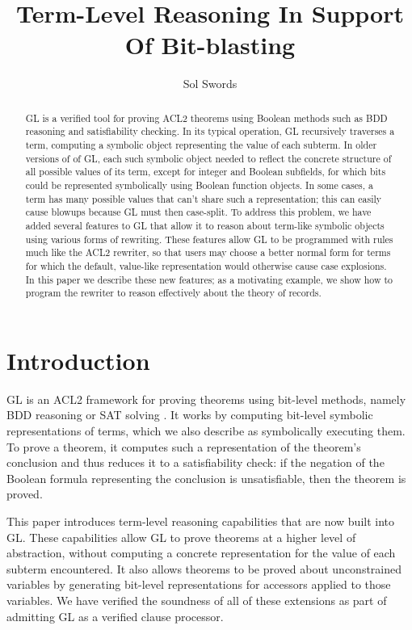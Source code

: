 \documentclass[submission,copyright,creativecommons]{eptcs}
\title{Term-Level Reasoning In Support Of Bit-blasting}
\author{Sol Swords
\institute{Centaur Techology, Inc.\\
Austin, TX, USA}
\email{sswords@centtech.com}
}
\begin{document}
\maketitle

\begin{abstract}

  GL is a verified tool for proving ACL2 theorems using Boolean
  methods such as BDD reasoning and satisfiability checking.  In its
  typical operation, GL recursively traverses a term, computing a
  symbolic object representing the value of each subterm.  In older
  versions of of GL, each such symbolic object needed to reflect the
  concrete structure of all possible values of its term, except for
  integer and Boolean subfields, for which bits could be represented
  symbolically using Boolean function objects.  In some cases, a term
  has many possible values that can't share such a
  representation; this can easily cause blowups because GL must then
  case-split.  To address this problem, we have added several features
  to GL that allow it to reason about term-like symbolic objects using
  various forms of rewriting.  These features allow GL to be
  programmed with rules much like the ACL2 rewriter, so that users may
  choose a better normal form for terms for which the default,
  value-like representation would otherwise cause case explosions.  In
  this paper we describe these new features; as a motivating example,
  we show how to program the rewriter to reason effectively about the
  theory of records.

\end{abstract}

\section{Introduction}
\label{sec:intro}

GL is an ACL2 framework for proving theorems using bit-level methods,
namely BDD reasoning or SAT solving \cite{bit-blasting-GL, gl-diss}.
It works by computing bit-level symbolic representations of terms,
which we also describe as symbolically executing them.  To prove a
theorem, it computes such a representation of the theorem's conclusion
and thus reduces it to a satisfiability check: if the negation of the Boolean formula
representing the conclusion is unsatisfiable, then the theorem is
proved.

This paper introduces term-level reasoning capabilities that are now
built into GL.  These capabilities allow GL to prove theorems at a
higher level of abstraction, without computing a concrete
representation for the value of each subterm encountered.  It also
allows theorems to be proved about unconstrained variables by
generating bit-level representations for accessors applied to those
variables.  We have verified the soundness of all of these extensions
as part of admitting GL as a verified clause processor.
\end{document}
